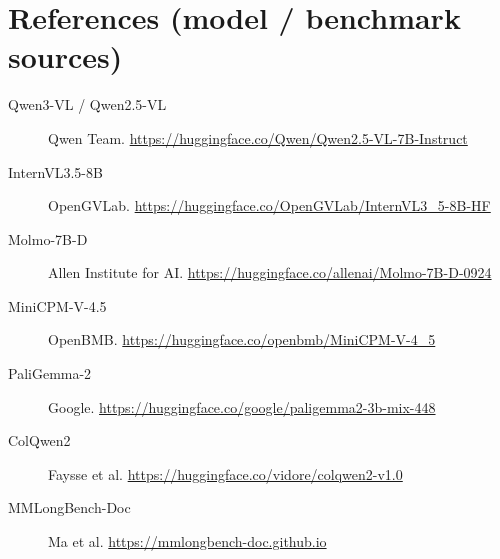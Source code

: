 \documentclass[letterpaper]{article} %
\begin{document}
\section*{References (model / benchmark sources)}
\begin{description}
\item[Qwen3-VL / Qwen2.5-VL] Qwen Team. \url{https://huggingface.co/Qwen/Qwen2.5-VL-7B-Instruct}
\item[InternVL3.5-8B] OpenGVLab. \url{https://huggingface.co/OpenGVLab/InternVL3_5-8B-HF}
\item[Molmo-7B-D] Allen Institute for AI. \url{https://huggingface.co/allenai/Molmo-7B-D-0924}
\item[MiniCPM-V-4.5] OpenBMB. \url{https://huggingface.co/openbmb/MiniCPM-V-4_5}
\item[PaliGemma-2] Google. \url{https://huggingface.co/google/paligemma2-3b-mix-448}
\item[ColQwen2] Faysse et al. \url{https://huggingface.co/vidore/colqwen2-v1.0}
\item[MMLongBench-Doc] Ma et al. \url{https://mmlongbench-doc.github.io}
\end{description}
\end{document}
